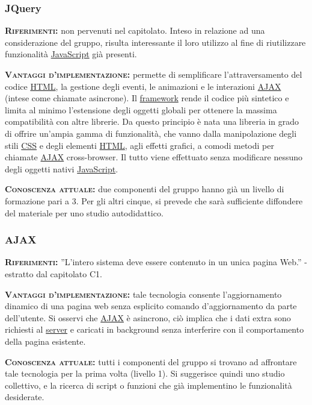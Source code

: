 \subsubsection{JQuery}
\begin{description}
	\item{\scshape\bfseries Riferimenti:} non pervenuti nel capitolato. Inteso in relazione ad una considerazione del gruppo, risulta interessante il loro utilizzo al fine di riutilizzare funzionalità \underline{JavaScript} già presenti.
	
	\item{\scshape\bfseries Vantaggi d'implementazione:} permette di semplificare l'attraversamento del codice \underline{HTML}, la gestione degli eventi, le animazioni e le interazioni \underline{AJAX} (intese come chiamate asincrone). Il \underline{framework} rende il codice più sintetico e limita al minimo l’estensione degli oggetti globali per ottenere la massima compatibilità con altre librerie. Da questo principio è nata una libreria in grado di offrire un'ampia gamma di funzionalità, che vanno dalla manipolazione degli stili \underline{CSS} e degli elementi \underline{HTML}, agli effetti grafici, a comodi metodi per chiamate \underline{AJAX} cross-browser. Il tutto viene effettuato senza modificare nessuno degli oggetti nativi \underline{JavaScript}.
	
	\item{\scshape\bfseries Conoscenza attuale:} due componenti del gruppo hanno già un livello di formazione pari a 3. Per gli altri cinque, si prevede che sarà sufficiente diffondere del materiale per uno studio autodidattico.
\end{description}

\subsubsection{AJAX}
\begin{description}
	\item{\scshape\bfseries Riferimenti:} ''L'intero sistema deve essere contenuto in un unica pagina Web.'' - estratto dal capitolato C1.

	\item{\scshape\bfseries Vantaggi d'implementazione:} tale tecnologia consente l'aggiornamento dinamico di una pagina web senza esplicito comando d'aggiornamento da parte dell'utente. Si osservi che \underline{AJAX} è asincrono, ciò implica che i dati extra sono richiesti al \underline{server} e caricati in background senza interferire con il comportamento della pagina esistente.
	
	\item{\scshape\bfseries Conoscenza attuale:} tutti i componenti del gruppo si trovano ad affrontare tale tecnologia per la prima volta (livello 1). Si suggerisce quindi uno studio collettivo, e la ricerca di script o funzioni che già implementino le funzionalità desiderate.
\end{description}

